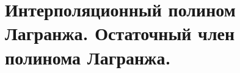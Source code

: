 \documentclass[../../calc-math-exam-2023.tex]{subfiles}
\begin{document}
    \section{Интерполяционный полином Лагранжа. Остаточный член полинома Лагранжа.}\label{sec:ch06}
\end{document}
